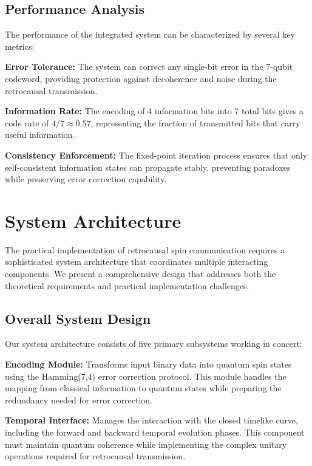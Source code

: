 \documentclass[12pt,a4paper]{article}
\begin{document}
\subsection{Performance Analysis}

The performance of the integrated system can be characterized by several key metrics:

\textbf{Error Tolerance:} The system can correct any single-bit error in the 7-qubit codeword, providing protection against decoherence and noise during the retrocausal transmission.

\textbf{Information Rate:} The encoding of 4 information bits into 7 total bits gives a code rate of $4/7 \approx 0.57$, representing the fraction of transmitted bits that carry useful information.

\textbf{Consistency Enforcement:} The fixed-point iteration process ensures that only self-consistent information states can propagate stably, preventing paradoxes while preserving error correction capability.

\section{System Architecture}

The practical implementation of retrocausal spin communication requires a sophisticated system architecture that coordinates multiple interacting components. We present a comprehensive design that addresses both the theoretical requirements and practical implementation challenges.

\subsection{Overall System Design}

Our system architecture consists of five primary subsystems working in concert:

\textbf{Encoding Module:} Transforms input binary data into quantum spin states using the Hamming(7,4) error correction protocol. This module handles the mapping from classical information to quantum states while preparing the redundancy needed for error correction.

\textbf{Temporal Interface:} Manages the interaction with the closed timelike curve, including the forward and backward temporal evolution phases. This component must maintain quantum coherence while implementing the complex unitary operations required for retrocausal transmission.
\end{document}
